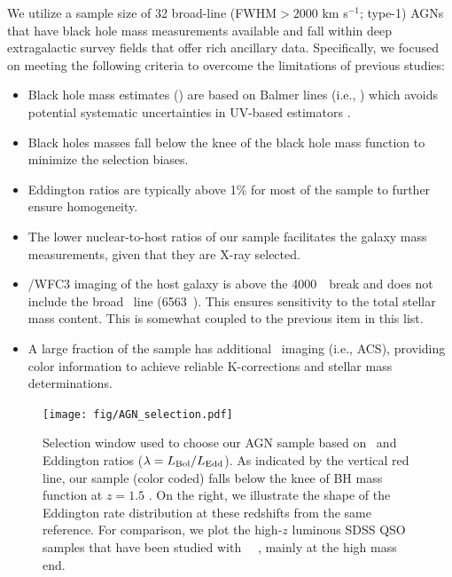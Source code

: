 \documentclass[apj]{emulateapj}
\begin{document}
We utilize a sample size of 32 broad-line (FWHM$>2000$ km s$^{-1}$; type-1) AGNs that have black hole mass measurements available and fall within deep extragalactic survey fields that offer rich ancillary data. Specifically, we focused on meeting the following criteria to overcome the limitations of previous studies:

\begin{itemize}

\item Black hole mass estimates (\mbh) are based on Balmer lines (i.e., \halpha) which avoids potential systematic uncertainties in UV-based estimators \citep{Greene2005}.

\item Black holes masses fall below the knee of the black hole mass function to minimize the selection biases.

\item Eddington ratios are typically above 1\% for most of the sample to further ensure homogeneity.

\item The lower nuclear-to-host ratios of our sample facilitates the galaxy mass measurements, given that they are 
X-ray selected.

\item \hst/WFC3 imaging of the host galaxy is above the 4000~\angstrom\ break and does not include the broad \halpha\ line (6563~\angstrom). This ensures sensitivity to the total stellar mass content. This is somewhat coupled to the previous item in this list.

\item A large fraction of the sample has additional \hst\ imaging (i.e., ACS), providing color information to achieve reliable K-corrections and stellar mass determinations. 
\end{itemize}

\begin{figure}
\centering
{
\texttt{[image: fig/AGN\_selection.pdf]}
}
\caption{\label{fig:selection} Selection window used to choose our AGN sample based on  \mbh~and Eddington ratios ($\lambda = L_{\rm Bol}/L_{\rm Edd}$). As indicated by the vertical red line, our sample (color coded) falls below the knee of BH mass function at $z=1.5$ \citep[top panel,][]{Schulze2015}. On the right, we illustrate the shape of the Eddington rate distribution at these redshifts from the same reference. For comparison, we plot the high-$z$ luminous SDSS QSO samples that have been studied with \hst\ ~\citep[grey squares and circles from][respectively]{Peng2006a, Decarli2010}, mainly at the high mass end.}
\end{figure} 
\end{document}
